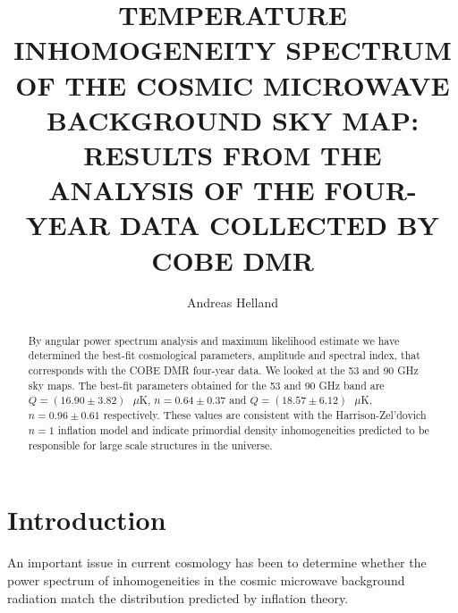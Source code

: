 \documentclass{emulateapj}
\begin{document}
	
	\title{TEMPERATURE INHOMOGENEITY SPECTRUM OF THE COSMIC MICROWAVE BACKGROUND SKY MAP: RESULTS FROM THE ANALYSIS OF THE FOUR-YEAR DATA COLLECTED BY COBE DMR} 

	
	\author{Andreas Helland}
	
	
	
	


\begin{abstract}
By angular power spectrum analysis and maximum likelihood estimate we have determined the best-fit cosmological parameters, amplitude and spectral index, that corresponds with the COBE DMR four-year data. We looked at the 53 and 90 GHz sky maps. The best-fit parameters obtained for the 53 and 90 GHz band are  $Q = (16.90 \pm 3.82) \text{ }\mu$K, $n = 0.64 \pm  0.37$ and $Q = (18.57 \pm 6.12) \text{ }\mu$K, $n = 0.96 \pm 0.61$ respectively. These values are consistent with the Harrison-Zel'dovich $n = 1$ inflation model and indicate primordial density inhomogeneities predicted to be responsible for large scale structures in the universe.
\end{abstract}




\section{Introduction}
\label{sec:introduction}

An important issue in current cosmology has been to determine whether the power spectrum of inhomogeneities in the cosmic microwave background radiation match the distribution predicted by inflation theory. 
\end{document}
